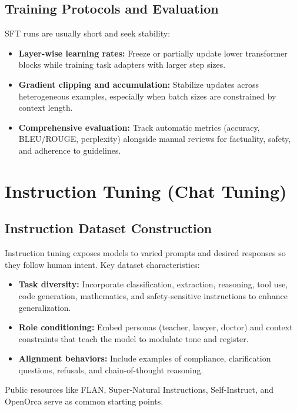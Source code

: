 \documentclass{article}
\begin{document}
\subsection{Training Protocols and Evaluation}
SFT runs are usually short and seek stability:
\begin{itemize}
  \item \textbf{Layer-wise learning rates:} Freeze or partially update lower transformer blocks while training task adapters with larger step sizes.
  \item \textbf{Gradient clipping and accumulation:} Stabilize updates across heterogeneous examples, especially when batch sizes are constrained by context length.
  \item \textbf{Comprehensive evaluation:} Track automatic metrics (accuracy, BLEU/ROUGE, perplexity) alongside manual reviews for factuality, safety, and adherence to guidelines.
\end{itemize}

\section{Instruction Tuning (Chat Tuning)}
\subsection{Instruction Dataset Construction}
Instruction tuning exposes models to varied prompts and desired responses so they follow human intent. Key dataset characteristics:
\begin{itemize}
  \item \textbf{Task diversity:} Incorporate classification, extraction, reasoning, tool use, code generation, mathematics, and safety-sensitive instructions to enhance generalization.
  \item \textbf{Role conditioning:} Embed personas (teacher, lawyer, doctor) and context constraints that teach the model to modulate tone and register.
  \item \textbf{Alignment behaviors:} Include examples of compliance, clarification questions, refusals, and chain-of-thought reasoning.
\end{itemize}
Public resources like FLAN, Super-Natural Instructions, Self-Instruct, and OpenOrca serve as common starting points.
\end{document}
